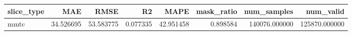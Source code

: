 \begin{tabular}{lrrrrrrr}
\toprule
slice_type & MAE & RMSE & R2 & MAPE & mask_ratio & num_samples & num_valid \\
\midrule
mmtc & 34.526695 & 53.583775 & 0.077335 & 42.951458 & 0.898584 & 140076.000000 & 125870.000000 \\
\bottomrule
\end{tabular}

